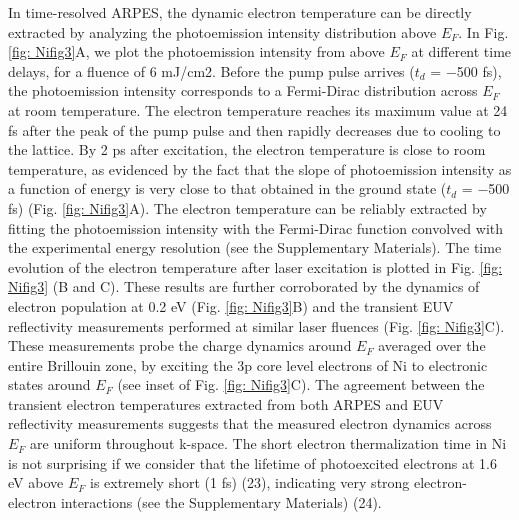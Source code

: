 In time-resolved ARPES, the dynamic electron temperature can be directly extracted by analyzing the photoemission intensity distribution above $E_{F}$. In Fig. 	\ref{fig: Nifig3}A, we plot the photoemission intensity from above $E_{F}$ at different time delays, for a fluence of 6 mJ/cm2. Before the pump pulse arrives ($t_{d}$ = −500 fs), the photoemission intensity corresponds to a Fermi-Dirac distribution across $E_{F}$ at room temperature. The electron temperature reaches its maximum value at 24 fs after the peak of the pump pulse and then rapidly decreases due to cooling to the lattice. By 2 ps after excitation, the electron temperature is close to room temperature, as evidenced by the fact that the slope of photoemission intensity as a function of energy is very close to that obtained in the ground state ($t_d$ = −500 fs) (Fig. \ref{fig: Nifig3}A). The electron temperature can be reliably extracted by fitting the photoemission intensity with the Fermi-Dirac function convolved with the experimental energy resolution (see the Supplementary Materials). The time evolution of the electron temperature after laser excitation is plotted in Fig. \ref{fig: Nifig3} (B and C). These results are further corroborated by the dynamics of electron population at 0.2 eV (Fig. \ref{fig: Nifig3}B) and the transient EUV reflectivity measurements performed at similar laser fluences (Fig. \ref{fig: Nifig3}C). These measurements probe the charge dynamics around $E_{F}$ averaged over the entire Brillouin zone, by exciting the 3p core level electrons of Ni to electronic states around $E_{F}$ (see inset of Fig. \ref{fig: Nifig3}C). The agreement between the transient electron temperatures extracted from both ARPES and EUV reflectivity measurements suggests that the measured electron dynamics across $E_{F}$ are uniform throughout k-space. The short electron thermalization time in Ni is not surprising if we consider that the lifetime of photoexcited electrons at 1.6 eV above $E_{F}$ is extremely short (1 fs) (23), indicating very strong electron-electron interactions (see the Supplementary Materials) (24). 
